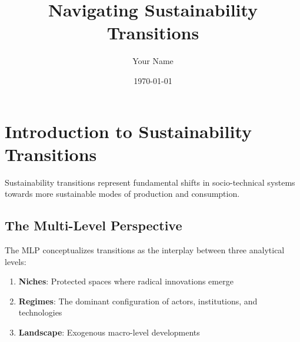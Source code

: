 \documentclass[
    fontsize=11pt,
    a4paper,
    twoside=true,
    open=any,
]{kaobook}
\title{Navigating Sustainability Transitions}
\author{Your Name}
\date{\today}
\begin{document}

\eurtitlepage



\frontmatter

\committeepage

\tableofcontents


\mainmatter
\setupeur %


\chapter{Introduction to Sustainability Transitions}

\margintoc %

Sustainability transitions represent fundamental shifts in socio-technical systems towards more sustainable modes of production and consumption.

\section{The Multi-Level Perspective}

The MLP conceptualizes transitions as the interplay between three analytical levels:

\begin{enumerate}
    \item \textbf{Niches}: Protected spaces where radical innovations emerge
    \item \textbf{Regimes}: The dominant configuration of actors, institutions, and technologies
    \item \textbf{Landscape}: Exogenous macro-level developments
\end{enumerate}
\end{document}
